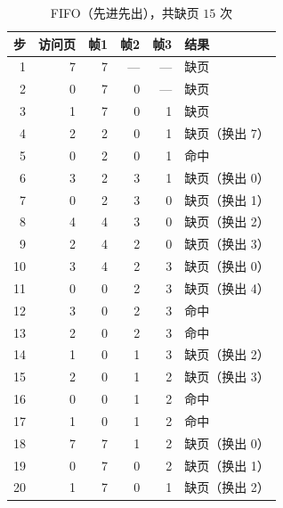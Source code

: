 \begin{table}[H]
\centering
\caption{FIFO（先进先出），共缺页 $15$ 次}
\begin{tabular}{rrrrrl}
\toprule
步 & 访问页 & 帧1 & 帧2 & 帧3 & 结果 \\
\midrule
 1 & 7 & 7 & — & — & 缺页 \\
 2 & 0 & 7 & 0 & — & 缺页 \\
 3 & 1 & 7 & 0 & 1 & 缺页 \\
 4 & 2 & 2 & 0 & 1 & 缺页（换出 7） \\
 5 & 0 & 2 & 0 & 1 & 命中 \\
 6 & 3 & 2 & 3 & 1 & 缺页（换出 0） \\
 7 & 0 & 2 & 3 & 0 & 缺页（换出 1） \\
 8 & 4 & 4 & 3 & 0 & 缺页（换出 2） \\
 9 & 2 & 4 & 2 & 0 & 缺页（换出 3） \\
10 & 3 & 4 & 2 & 3 & 缺页（换出 0） \\
11 & 0 & 0 & 2 & 3 & 缺页（换出 4） \\
12 & 3 & 0 & 2 & 3 & 命中 \\
13 & 2 & 0 & 2 & 3 & 命中 \\
14 & 1 & 0 & 1 & 3 & 缺页（换出 2） \\
15 & 2 & 0 & 1 & 2 & 缺页（换出 3） \\
16 & 0 & 0 & 1 & 2 & 命中 \\
17 & 1 & 0 & 1 & 2 & 命中 \\
18 & 7 & 7 & 1 & 2 & 缺页（换出 0） \\
19 & 0 & 7 & 0 & 2 & 缺页（换出 1） \\
20 & 1 & 7 & 0 & 1 & 缺页（换出 2） \\
\bottomrule
\end{tabular}
\end{table}

